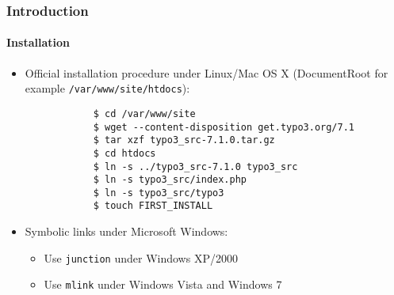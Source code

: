 \begin{frame}[fragile]
	\frametitle{Introduction}
	\framesubtitle{Installation}

	\begin{itemize}
		\item Official installation procedure under Linux/Mac OS X\newline
			(DocumentRoot for example \texttt{/var/www/site/htdocs}):
		\begin{lstlisting}
			$ cd /var/www/site
			$ wget --content-disposition get.typo3.org/7.1
			$ tar xzf typo3_src-7.1.0.tar.gz
			$ cd htdocs
			$ ln -s ../typo3_src-7.1.0 typo3_src
			$ ln -s typo3_src/index.php
			$ ln -s typo3_src/typo3
			$ touch FIRST_INSTALL
		\end{lstlisting}

		\item Symbolic links under Microsoft Windows:

			\begin{itemize}
				\item Use \texttt{junction} under Windows XP/2000
				\item Use \texttt{mlink} under Windows Vista and Windows 7
			\end{itemize}

	\end{itemize}
\end{frame}


